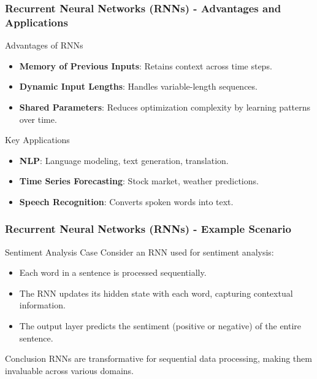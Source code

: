 \documentclass[aspectratio=169]{beamer}
\begin{document}
\begin{frame}[fragile]
    \frametitle{Recurrent Neural Networks (RNNs) - Advantages and Applications}
    \begin{block}{Advantages of RNNs}
        \begin{itemize}
            \item \textbf{Memory of Previous Inputs}: Retains context across time steps.
            \item \textbf{Dynamic Input Lengths}: Handles variable-length sequences.
            \item \textbf{Shared Parameters}: Reduces optimization complexity by learning patterns over time.
        \end{itemize}
    \end{block}

    \begin{block}{Key Applications}
        \begin{itemize}
            \item \textbf{NLP}: Language modeling, text generation, translation.
            \item \textbf{Time Series Forecasting}: Stock market, weather predictions.
            \item \textbf{Speech Recognition}: Converts spoken words into text.
        \end{itemize}
    \end{block}
\end{frame}

\begin{frame}[fragile]
    \frametitle{Recurrent Neural Networks (RNNs) - Example Scenario}
    \begin{block}{Sentiment Analysis Case}
        Consider an RNN used for sentiment analysis:
        \begin{itemize}
            \item Each word in a sentence is processed sequentially.
            \item The RNN updates its hidden state with each word, capturing contextual information.
            \item The output layer predicts the sentiment (positive or negative) of the entire sentence.
        \end{itemize}
    \end{block}

    \begin{block}{Conclusion}
        RNNs are transformative for sequential data processing, making them invaluable across various domains.
    \end{block}
\end{frame}
\end{document}
